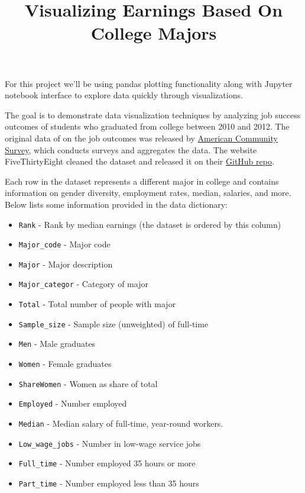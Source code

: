 \documentclass[11pt]{article}
\title{Visualizing Earnings Based On College Majors}
\providecommand{\tightlist}{%
      \setlength{\itemsep}{0pt}\setlength{\parskip}{0pt}}
\begin{document}
    
    
    \maketitle
    
    

    
    For this project we'll be using pandas plotting functionality along with
Jupyter notebook interface to explore data quickly through
visualizations.

The goal is to demonstrate data visualization techniques by analyzing
job success outcomes of students who graduated from college between 2010
and 2012. The original data of on the job outcomes was released by
\href{https://www.census.gov/programs-surveys/acs/}{American Community
Survey}, which conducts surveys and aggregates the data. The website
FiveThirtyEight cleaned the dataset and released it on their
\href{https://github.com/fivethirtyeight/data/tree/master/college-majors}{GitHub
repo}.

Each row in the dataset represents a different major in college and
contains information on gender diversity, employment rates, median,
salaries, and more. Below lists some information provided in the data
dictionary:

    \begin{itemize}
\tightlist
\item
  \texttt{Rank} - Rank by median earnings (the dataset is ordered by
  this column)
\item
  \texttt{Major\_code} - Major code
\item
  \texttt{Major} - Major description
\item
  \texttt{Major\_categor} - Category of major
\item
  \texttt{Total} - Total number of people with major
\item
  \texttt{Sample\_size} - Sample size (unweighted) of full-time
\item
  \texttt{Men} - Male graduates
\item
  \texttt{Women} - Female graduates
\item
  \texttt{ShareWomen} - Women as share of total
\item
  \texttt{Employed} - Number employed
\item
  \texttt{Median} - Median salary of full-time, year-round workers.
\item
  \texttt{Low\_wage\_jobs} - Number in low-wage service jobs
\item
  \texttt{Full\_time} - Number employed 35 hours or more
\item
  \texttt{Part\_time} - Number employed less than 35 hours
\end{itemize}
\end{document}
